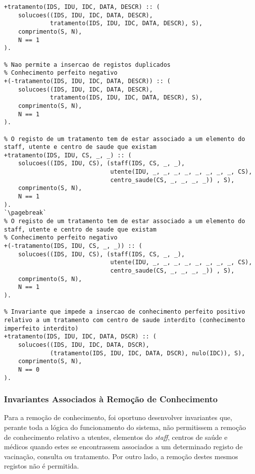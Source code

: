 \begin{lstlisting}[caption={Invariantes de inserção relativos ao predicado \texttt{tratamento}}]
% Nao permite a insercao de registos duplicados
+tratamento(IDS, IDU, IDC, DATA, DESCR) :: (
    solucoes((IDS, IDU, IDC, DATA, DESCR),
             tratamento(IDS, IDU, IDC, DATA, DESCR), S),
    comprimento(S, N),
    N == 1
).

% Nao permite a insercao de registos duplicados
% Conhecimento perfeito negativo
+(-tratamento(IDS, IDU, IDC, DATA, DESCR)) :: (
    solucoes((IDS, IDU, IDC, DATA, DESCR),
             tratamento(IDS, IDU, IDC, DATA, DESCR), S),
    comprimento(S, N),
    N == 1
).

% O registo de um tratamento tem de estar associado a um elemento do staff, utente e centro de saude que existam
+tratamento(IDS, IDU, CS, _, _) :: (
    solucoes((IDS, IDU, CS), (staff(IDS, CS, _, _),
                              utente(IDU, _, _, _, _, _, _, _, _, CS),
                              centro_saude(CS, _, _, _, _)) , S),
    comprimento(S, N),
    N == 1
).
`\pagebreak`
% O registo de um tratamento tem de estar associado a um elemento do staff, utente e centro de saude que existam
% Conhecimento perfeito negativo
+(-tratamento(IDS, IDU, CS, _, _)) :: (
    solucoes((IDS, IDU, CS), (staff(IDS, CS, _, _),
                              utente(IDU, _, _, _, _, _, _, _, _, CS),
                              centro_saude(CS, _, _, _, _)) , S),
    comprimento(S, N),
    N == 1
).

% Invariante que impede a insercao de conhecimento perfeito positivo relativo a um tratamento com centro de saude interdito (conhecimento imperfeito interdito)
+tratamento(IDS, IDU, IDC, DATA, DSCR) :: (
    solucoes((IDS, IDU, IDC, DATA, DSCR),
             (tratamento(IDS, IDU, IDC, DATA, DSCR), nulo(IDC)), S),
    comprimento(S, N),
    N == 0
).

\end{lstlisting}

\subsubsection{Invariantes Associados à Remoção de Conhecimento}
Para a remoção de conhecimento, foi oportuno desenvolver invariantes que, perante toda a lógica do funcionamento do sistema,
não permitissem a remoção de conhecimento relativo a utentes, elementos do \textit{staff}, centros de saúde e médicos
quando estes se encontrassem associados a um determinado registo de vacinação, consulta ou tratamento. Por outro lado, a
remoção destes mesmos registos não é permitida.


